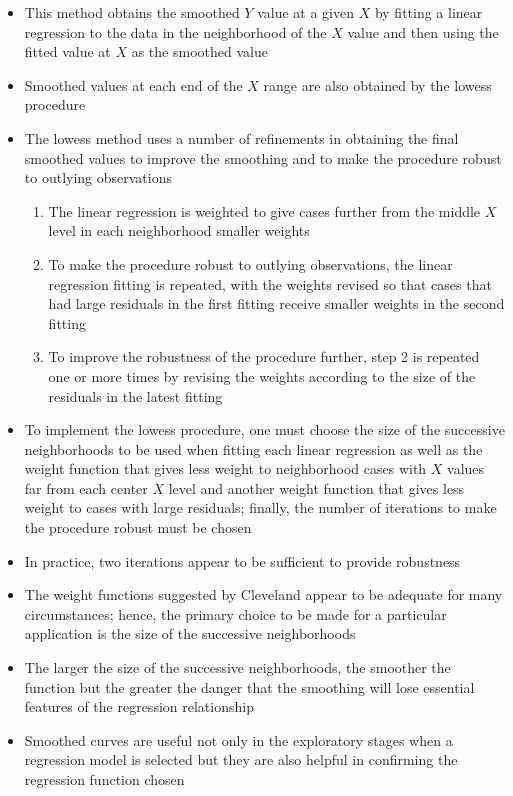 \begin{itemize}
\item This method obtains the smoothed $Y$ value at a given $X$ by fitting a linear regression to the data in the neighborhood of the $X$ value and then using the fitted value at $X$ as the smoothed value 
\item Smoothed values at each end of the $X$ range are also obtained by the lowess procedure 
\item The lowess method uses a number of refinements in obtaining the final smoothed values to improve the smoothing and to make the procedure robust to outlying observations \begin{enumerate} 
\item The linear regression is weighted to give cases further from the middle $X$ level in each neighborhood smaller weights 
\item To make the procedure robust to outlying observations, the linear regression fitting is repeated, with the weights revised so that cases that had large residuals in the first fitting receive smaller weights in the second fitting
\item To improve the robustness of the procedure further, step 2 is repeated one or more times by revising the weights according to the size of the residuals in the latest fitting \end{enumerate}
\item To implement the lowess procedure, one must choose the size of the successive neighborhoods to be used when fitting each linear regression as well as the weight function that gives less weight to neighborhood cases with $X$ values far from each center $X$ level and another weight function that gives less weight to cases with large residuals; finally, the number of iterations to make the procedure robust must be chosen
\item In practice, two iterations appear to be sufficient to provide robustness
\item The weight functions suggested by Cleveland appear to be adequate for many circumstances; hence, the primary choice to be made for a particular application is the size of the successive neighborhoods
\item  The larger the size of the successive neighborhoods, the smoother the function but the greater the danger that the smoothing will lose essential features of the regression relationship
\item Smoothed curves are useful not only in the exploratory stages when a regression model is selected but they are also helpful in confirming the regression function chosen

\end{itemize}
